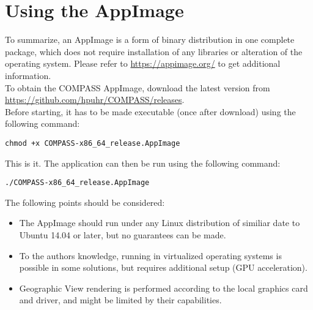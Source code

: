 \section{Using the AppImage}

To summarize, an AppImage is a form of binary distribution in one complete package, which does not require installation of any libraries or alteration of the operating system. 
Please refer to \url{https://appimage.org/} to get additional information. \\

To obtain the COMPASS AppImage, download the latest version from \url{https://github.com/hpuhr/COMPASS/releases}. \\

Before starting, it has to be made executable (once after download) using the following command:
\begin{lstlisting}
chmod +x COMPASS-x86_64_release.AppImage
\end{lstlisting}

This is it. The application can then be run using the following command:
\begin{lstlisting}
./COMPASS-x86_64_release.AppImage
\end{lstlisting}

The following points should be considered:

\begin{itemize}  
\item The AppImage should run under any Linux distribution of similiar date to Ubuntu 14.04 or later, but no guarantees can be made.
\item To the authors knowledge, running in virtualized operating systems is possible in some solutions, but requires additional setup (GPU acceleration).
\item Geographic View rendering is performed according to the local graphics card and driver, and might be limited by their capabilities.
\end{itemize} 
